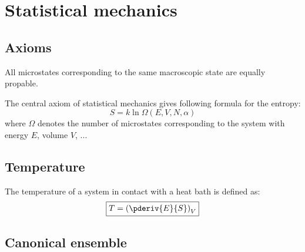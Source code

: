 \chapter{Statistical mechanics}

\section{Axioms}
    
	\begin{theorem}
    		All microstates corresponding to the same macroscopic state are equally propable.
	\end{theorem}
	
	\begin{theorem}
    		The central axiom of statistical mechanics gives following formula for the entropy:
		\begin{equation}
			\label{statmech:boltzmann_formula}
        		\boxed{S = k\ln\Omega(E, V, N, \alpha)}
		\end{equation}
	        where $\Omega$ denotes the number of microstates corresponding to the system with energy $E$, volume $V$, ...
	\end{theorem}
    
\section{Temperature}

    	\begin{formula}
		The temperature of a system in contact with a heat bath is defined as:
		\begin{equation}
		    	\label{statmech:temperature}
			\boxed{T = \left(\pderiv{E}{S}\right)_V}
		\end{equation}
	\end{formula}

\section{Canonical ensemble}

	
